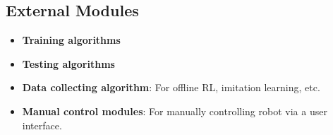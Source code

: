 \documentclass{article}
\begin{document}
\subsection{External Modules}

\begin{itemize}[nolistsep]
    \item \textbf{Training algorithms}
    \item \textbf{Testing algorithms}
    \item \textbf{Data collecting algorithm}: For offline RL, imitation learning, etc.
    \item \textbf{Manual control modules}: For manually controlling robot via a user interface.
\end{itemize}
\end{document}
